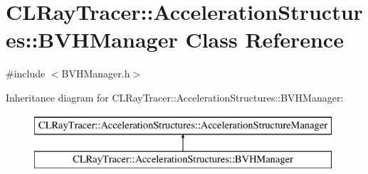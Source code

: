 \hypertarget{class_c_l_ray_tracer_1_1_acceleration_structures_1_1_b_v_h_manager}{}\section{C\+L\+Ray\+Tracer\+:\+:Acceleration\+Structures\+:\+:B\+V\+H\+Manager Class Reference}
\label{class_c_l_ray_tracer_1_1_acceleration_structures_1_1_b_v_h_manager}


{\ttfamily \#include $<$B\+V\+H\+Manager.\+h$>$}

Inheritance diagram for C\+L\+Ray\+Tracer\+:\+:Acceleration\+Structures\+:\+:B\+V\+H\+Manager\+:\begin{figure}[H]
\begin{center}
\leavevmode
\includegraphics[height=2.000000cm]{class_c_l_ray_tracer_1_1_acceleration_structures_1_1_b_v_h_manager}
\end{center}
\end{figure}
